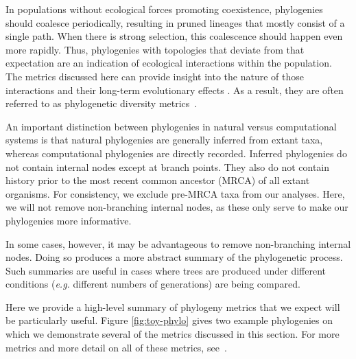 \documentclass[letterpaper]{article}
\begin{document}
In populations without ecological forces promoting coexistence, phylogenies should coalesce periodically, resulting in pruned lineages that mostly consist of a single path. When there is strong selection, this coalescence should happen even more rapidly. Thus, phylogenies with topologies that deviate from that expectation are an indication of ecological interactions within the population. The metrics discussed here can provide insight into the nature of those interactions and their long-term evolutionary effects \citep{dolson_ecological_2018-1}. As a result, they are often referred to as phylogenetic diversity metrics~\citep{tucker_guide_2017}.

An important distinction between phylogenies in natural versus computational systems is that natural phylogenies are generally inferred from extant taxa, whereas computational phylogenies are directly recorded. Inferred phylogenies do not contain internal nodes except at branch points. They also do not contain history prior to the most recent common ancestor (MRCA) of all extant organisms. For consistency, we exclude pre-MRCA taxa from our analyses. Here, we will not remove non-branching internal nodes, as these only serve to make our phylogenies more informative. 

In some cases, however, it may be advantageous to remove non-branching internal nodes. Doing so produces a more abstract summary of the phylogenetic process. Such summaries are useful in cases where trees are produced under different conditions (\textit{e.g.} different numbers of generations) are being compared.

Here we provide a high-level summary of phylogeny metrics that we expect will be particularly useful.
Figure \ref{fig:toy-phylo} gives two example phylogenies on which we demonstrate several of the metrics discussed in this section.
For more metrics and more detail on all of these metrics, see~\citep{winter_phylogenetic_2013, tucker_guide_2017}. 
\end{document}
